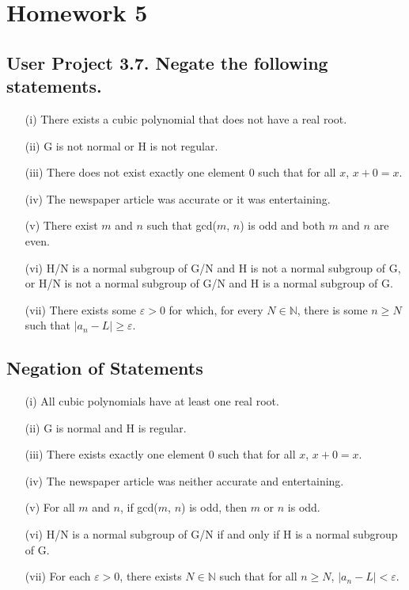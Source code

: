 \documentclass[12pt]{article}
\begin{document}
\pagestyle{fancy}
\fancyhf{} %
\setlength{\headheight}{41.54604pt}
\addtolength{\topmargin}{-27.04604pt}

\section*{Homework 5}

\subsection*{User
Project 3.7. Negate the following statements.}

\begin{enumerate}
  \item[(i)] There exists a cubic polynomial that does not have a real root.
  \item[(ii)] G is not normal or H is not regular.
  \item[(iii)] There does not exist exactly one element 0 such that for all \( x \), \( x + 0 = x \).
  \item[(iv)] The newspaper article was accurate or it was entertaining.
  \item[(v)] There exist \( m \) and \( n \) such that gcd(\( m \), \( n \)) is odd and both \( m \) and \( n \) are even.
  \item[(vi)] H/N is a normal subgroup of G/N and H is not a normal subgroup of G, or H/N is not a normal subgroup of G/N and H is a normal subgroup of G.
  \item[(vii)] There exists some \( \varepsilon > 0 \) for which, for every \( N \in \mathbb{N} \), there is some \( n \geq N \) such that \( |a_n − L| \geq \varepsilon \).
\end{enumerate}

\subsection*{Negation of Statements}


\begin{enumerate}
  \item[(i)] All cubic polynomials have at least one real root.
  \item[(ii)] G is normal and H is regular.
  \item[(iii)] There exists exactly one element 0 such that for all \(x\), \(x + 0 = x\).
  \item[(iv)] The newspaper article was neither accurate and entertaining.
  \item[(v)] For all \(m\) and \(n\), if gcd(\(m\), \(n\)) is odd, then \(m\) or \(n\) is odd.
  \item[(vi)] H/N is a normal subgroup of G/N if and only if H is a normal subgroup of G.
  \item[(vii)] For each \(\varepsilon > 0\), there exists \(N \in \mathbb{N}\) such that for all \(n \geq N\), \(|a_n − L| < \varepsilon\).
\end{enumerate}
\end{document}
